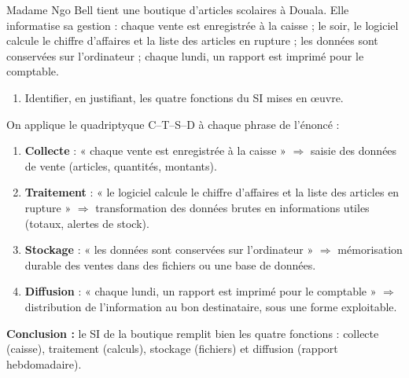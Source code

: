 \documentclass[11pt]{article}
\begin{document}
\begin{exoresolu}
Madame Ngo Bell tient une boutique d'articles scolaires à Douala. Elle informatise sa gestion : chaque vente est enregistrée à la caisse ; le soir, le logiciel calcule le chiffre d'affaires et la liste des articles en rupture ; les données sont conservées sur l'ordinateur ; chaque lundi, un rapport est imprimé pour le comptable.
\begin{enumerate}
\item Identifier, en justifiant, les quatre fonctions du SI mises en œuvre.
\end{enumerate}
\tcblower
On applique le quadriptyque C--T--S--D à chaque phrase de l'énoncé :
\begin{enumerate}
\item \textbf{Collecte} : « chaque vente est enregistrée à la caisse » $\Rightarrow$ saisie des données de vente (articles, quantités, montants).
\item \textbf{Traitement} : « le logiciel calcule le chiffre d'affaires et la liste des articles en rupture » $\Rightarrow$ transformation des données brutes en informations utiles (totaux, alertes de stock).
\item \textbf{Stockage} : « les données sont conservées sur l'ordinateur » $\Rightarrow$ mémorisation durable des ventes dans des fichiers ou une base de données.
\item \textbf{Diffusion} : « chaque lundi, un rapport est imprimé pour le comptable » $\Rightarrow$ distribution de l'information au bon destinataire, sous une forme exploitable.
\end{enumerate}
\textbf{Conclusion :} le SI de la boutique remplit bien les quatre fonctions : collecte (caisse), traitement (calculs), stockage (fichiers) et diffusion (rapport hebdomadaire).
\end{exoresolu}
\end{document}

